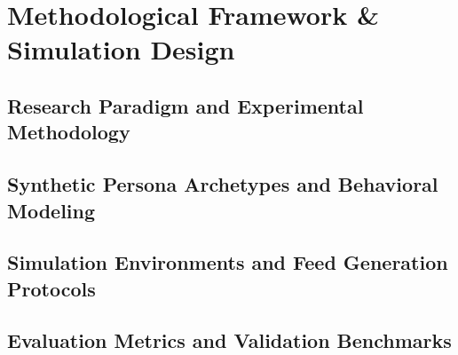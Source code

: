 \chapter{Methodological Framework \& Simulation Design}
\label{chap:methodology}

\section{Research Paradigm and Experimental Methodology}
\label{sec:meth_paradigm}

\section{Synthetic Persona Archetypes and Behavioral Modeling}
\label{sec:meth_personas}

\section{Simulation Environments and Feed Generation Protocols}
\label{sec:meth_simulation_protocols}

\section{Evaluation Metrics and Validation Benchmarks}
\label{sec:meth_metrics}

